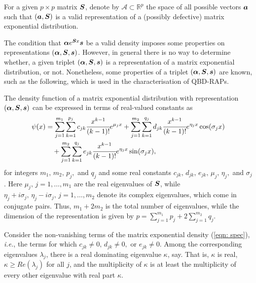 For a given \(p\times p\) matrix \(\boldsymbol S\), denote by \(\mathcal{A}\subset \mathbb R^p\) the space of all possible vectors \(\boldsymbol a\) such that \((\boldsymbol a, \boldsymbol S)\) is a valid representation of a (possibly defective) matrix exponential distribution.

The condition that \(\boldsymbol \alpha e^{\boldsymbol Sx}\boldsymbol s\) be a valid density imposes some properties on representations \((\boldsymbol \alpha, \boldsymbol S, \boldsymbol s)\). However, in general there is no way to determine whether, a given triplet \((\boldsymbol \alpha, \boldsymbol S, \boldsymbol s)\) is a representation of a matrix exponential distribution, or not. Nonetheless, some properties of a triplet \((\boldsymbol \alpha, \boldsymbol S, \boldsymbol s)\) are known, such as the following, which is used in the characterisation of QBD-RAPs. 
\begin{thm}
	The density function of a matrix exponential distribution with representation \((\boldsymbol\alpha, \boldsymbol S, \boldsymbol s)\) can be expressed in terms of real-valued constants as 
	\begin{align}
		\psi(x)&=\sum_{j=1}^{m_1} \sum_{k=1}^{p_j} c_{jk} \cfrac{x^{k-1}}{(k-1)!} e^{\mu_jx} + \sum_{j=1}^{m_2}\sum_{k=1}^{q_j} d_{jk}\cfrac{x^{k-1}}{(k-1)!}e^{\eta_jx}\cos(\sigma_jx) \nonumber 
		\\&\quad{}+ \sum_{j=1}^{m_2}\sum_{k=1}^{q_j}e_{jk}\cfrac{x^{k-1}}{(k-1)!}e^{\eta_jx}\sin(\sigma_jx), \label{eqn: spec}
	\end{align}
	for integers \(m_1,\,m_2,\,p_j,\) and \(q_j\) and some real constants \(c_{jk},\,d_{jk},\,e_{jk},\,\mu_j,\,\eta_j,\) and \(\sigma_j\). Here \(\mu_j,\, j=1,\dots,m_1\) are the real eigenvalues of \(\boldsymbol S\), while \(\eta_j+i\sigma_j, \, \eta_j-i\sigma_j,\, j=1,\dots,m_2\) denote its complex eigenvalues, which come in conjugate pairs. Thus, \(m_1+2m_2\) is the total number of eigenvalues, while the dimension of the representation is given by \(\displaystyle p=\sum_{j=1}^{m_1}p_j + 2\sum_{j=1}^{m_2}q_j\). 
\end{thm}
\begin{thm}\label{thm: 4.1.4}
	Consider the non-vanishing terms of the matrix exponential density (\ref{eqn: spec}), \emph{i.e.}, the terms for which \(c_{jk}\neq 0,\,d_{jk}\neq 0,\) or \(e_{jk}\neq 0\). Among the corresponding eigenvalues \(\lambda_j\), there is a real dominating eigenvalue \(\kappa\), say. That is, \(\kappa\) is real, \(\kappa \geq Re(\lambda_j)\) for all \(j\), and the multiplicity of \(\kappa\) is at least the multiplicity of every other eigenvalue with real part \(\kappa\).
\end{thm}
